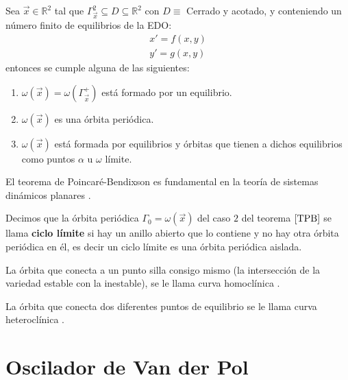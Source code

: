 \begin{theorem}\label{TPB}
	Sea $\vec{x}\in\mathbb{R}^2$ tal que $\varGamma_{\vec{x}}^2\subseteq D\subseteq\mathbb{R}^2$ con $D\equiv$ Cerrado y acotado,
	y conteniendo un número finito de equilibrios de la EDO:
	\begin{equation}
		\begin{matrix}
			x' = f(x,y) \\
			y' = g(x,y)
		\end{matrix}
	\end{equation}
	entonces se cumple alguna de las siguientes:
	\begin{enumerate}
		\item $\omega(\vec{x})=\omega(\varGamma_{\vec{x}}^+)$ está formado por un equilibrio.
		\item $\omega(\vec{x})$ es una órbita periódica.
		\item $\omega(\vec{x})$ está formada por equilibrios y órbitas que tienen a dichos equilibrios como puntos
		      $\alpha$ u $\omega$ límite.
	\end{enumerate}
\end{theorem}

El teorema de Poincaré-Bendixson es fundamental en la teoría de sistemas dinámicos planares \cite{poincare1881memoire,bendixson1901courbes}.

\begin{definition}
	Decimos que la órbita periódica $\varGamma_0=\omega(\vec{x})$
	del caso $2$ del teorema $\ref{TPB}$ se llama
	\textbf{ciclo límite} si hay un anillo abierto que lo
	contiene y no hay otra órbita periódica en él, es decir
	un ciclo límite es una órbita periódica aislada.
\end{definition}

\begin{definition}
	La órbita que conecta a un punto silla consigo mismo (la intersección de la variedad estable con la inestable), se le llama curva homoclínica \cite{kuznetsov2013elements}.
\end{definition}

\begin{definition}
	La órbita que conecta dos diferentes puntos de equilibrio se le llama curva heteroclínica \cite{kuznetsov2013elements}.
\end{definition}
\newpage

\section{Oscilador de Van der Pol}


